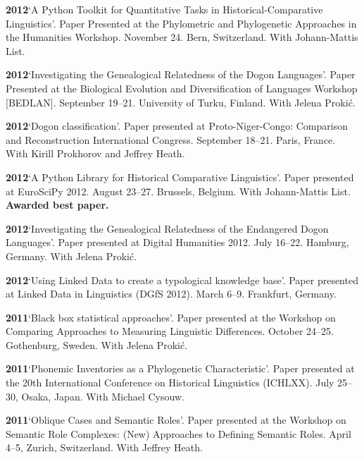 \documentclass[11pt]{article}
\newcommand{\hangpara}{
 \setlength{\parindent}{0in} %
 \hangindent=0.42in %
}
\begin{document}
\vskip 6pt
\hangpara
{\bf 2012}\hspace{1ex}`A Python Toolkit for Quantitative Tasks in Historical-Comparative Linguistics'. Paper Presented at the Phylometric and Phylogenetic Approaches in the Humanities Workshop. November 24. Bern, Switzerland. With Johann-Mattis List.

\vskip 6pt
\hangpara
{\bf 2012}\hspace{1ex}`Investigating the Genealogical Relatedness of the Dogon Languages'. Paper Presented at the Biological Evolution and Diversification of Languages Workshop [BEDLAN]. September 19--21. University of Turku, Finland. With Jelena Proki{\'c}.

\vskip 6pt
\hangpara
{\bf 2012}\hspace{1ex}`Dogon classification'. Paper presented at Proto-Niger-Congo: Comparison and Reconstruction International Congress. September 18--21. Paris, France. With Kirill Prokhorov and Jeffrey Heath.

\vskip 6pt
\hangpara
{\bf 2012}\hspace{1ex}`A Python Library for Historical Comparative Linguistics'. Paper presented at EuroSciPy 2012. August 23--27. Brussels, Belgium. With Johann-Mattis List. \textbf{Awarded best paper.}

\vskip 6pt
\hangpara
{\bf 2012}\hspace{1ex}`Investigating the Genealogical Relatedness of the Endangered Dogon Languages'. Paper presented at Digital Humanities 2012. July 16--22. Hamburg, Germany. With Jelena Proki{\'c}.

\vskip 6pt
\hangpara
{\bf 2012}\hspace{1ex}`Using Linked Data to create a typological knowledge base'. Paper presented at Linked Data in Linguistics (DGfS 2012). March 6--9. Frankfurt, Germany.

\vskip 6pt
\hangpara
{\bf 2011}\hspace{1ex}`Black box statistical approaches'. Paper presented at the Workshop on Comparing Approaches to Measuring Linguistic Differences. October 24--25. Gothenburg, Sweden. With Jelena Proki{\'c}.

\vskip 6pt
\hangpara
{\bf 2011}\hspace{1ex}`Phonemic Inventories as a Phylogenetic Characteristic'. Paper presented at the 20th International Conference on Historical Linguistics (ICHLXX). July 25--30, Osaka, Japan. With Michael Cysouw.

\vskip 6pt
\hangpara
{\bf 2011}\hspace{1ex}`Oblique Cases and Semantic Roles'. Paper presented at the Workshop on Semantic Role Complexes: (New) Approaches to Defining Semantic Roles. April 4--5, Zurich, Switzerland. With Jeffrey Heath.
\end{document}

